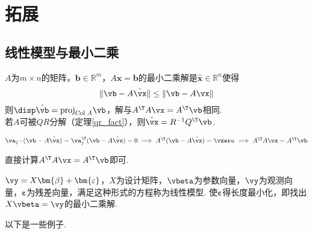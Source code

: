 
\section{拓展}
\subsection{线性模型与最小二乘}%
\begin{theorem}[最小二乘]
$A$为$m\times n$的矩阵，$\mathbf{b}\in\mathbb{R}^m$，$A\mathbf{x}=\mathbf{b}$的最小二乘解是$\hat{\mathbf{x}}\in\mathbb{R}^n$使得
\[\|\vb-A\hat{\vx}\|\leq\|\vb-A\vx\|\]
则$\disp\hat{\vb}=\mathrm{proj}_{\mathrm{Col}\;A}\vb$，解与$A^\T A\vx=A^\T \vb$相同.\\
若$A$可被$QR$分解（定理\ref{qr_fact}），则$\hat{\vx}=R^{-1}Q^\T \vb$.
\end{theorem}
\begin{analysis}
$\va_j\cdot(\vb-A\hat{\vx})=\va_j^\T (\vb-A\hat{\vx})=0\implies A^\T (\vb-A\hat{\vx})=\vzero\implies A^\T A\vx=A^\T \vb$
\end{analysis}
\begin{myalgorithm}[最小二乘估计]
直接计算$A^\T A\vx=A^\T \vb$即可.
\end{myalgorithm}
\begin{definition}[一般线性模型]
$\vy=X\bm{\beta}+\bm{\varepsilon}$，$X$为设计矩阵，$\vbeta$为参数向量，$\vy$为观测向量，$\bm{\varepsilon}$为残差向量，满足这种形式的方程称为线性模型. 使$\bm{\varepsilon}$得长度最小化，即找出$X\vbeta=\vy$的最小二乘解.
\end{definition}
以下是一些例子.
